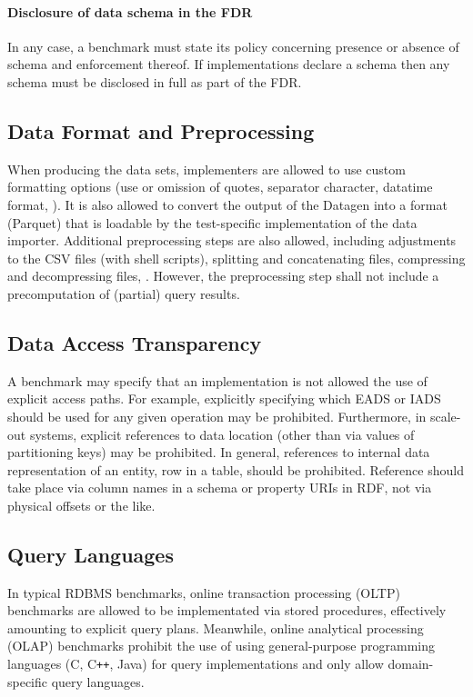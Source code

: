\paragraph{Disclosure of data schema in the FDR}
In any case, a benchmark must state its policy concerning presence or absence of schema and enforcement thereof. If implementations declare a schema then any schema must be disclosed in full as part of the FDR.

\subsection{Data Format and Preprocessing}
\label{sec:auditing-data-format}

When producing the data sets, implementers are allowed to use custom formatting options (\eg use or omission of quotes, separator character, datatime format, \etc).
It is also allowed to convert the output of the Datagen into a format (\eg Parquet) that is loadable by the test-specific implementation of the data importer.
Additional preprocessing steps are also allowed, including adjustments to the CSV files (\eg with shell scripts), splitting and concatenating files, compressing and decompressing files, \etc.
However, the preprocessing step shall not include a precomputation of (partial) query results.

\subsection{Data Access Transparency}

A benchmark may specify that an implementation is not allowed the use of explicit access paths. For example, explicitly specifying which EADS or IADS should be used for any given operation may be prohibited. Furthermore, in scale-out systems, explicit references to data location (other than via values of partitioning keys) may be prohibited. In general, references to internal data representation of an entity, \eg row in a table, should be prohibited. Reference should take place via column names in a schema or property URIs in RDF, not via physical offsets or the like.

\subsection{Query Languages}
\label{sec:query-languages}

In typical RDBMS benchmarks, online transaction processing (OLTP) benchmarks are allowed to be implementated via stored procedures, effectively amounting to explicit query plans.
Meanwhile, online analytical processing (OLAP) benchmarks prohibit the use of using general-purpose programming languages (\eg C, C\texttt{++}, Java) for query implementations and only allow domain-specific query languages.

